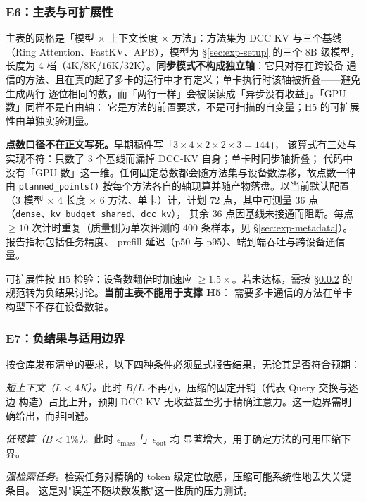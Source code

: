 \subsubsection{E6：主表与可扩展性}

主表的网格是「模型 $\times$ 上下文长度 $\times$ 方法」：方法集为 DCC-KV 与三个基线
（Ring Attention、FastKV、APB），模型为 \S\ref{sec:exp-setup} 的三个 8B 级模型，
长度为 4 档（$4$K/$8$K/$16$K/$32$K）。\textbf{同步模式不构成独立轴}：它只对存在跨设备
通信的方法、且在真的起了多卡的运行中才有定义；单卡执行时该轴被折叠——避免生成两行
逐位相同的数，而「两行一样」会被误读成「异步没有收益」。「GPU 数」同样不是自由轴：
它是方法的前置要求，不是可扫描的自变量；H5 的可扩展性由单独实验测量。

\textbf{点数口径不在正文写死。}早期稿件写「$3\times4\times2\times2\times3=144$」，
该算式有三处与实现不符：只数了 3 个基线而漏掉 DCC-KV 自身；单卡时同步轴折叠；
代码中没有「GPU 数」这一维。任何固定总数都会随方法集与设备数漂移，故点数一律由
\texttt{planned\_points()} 按每个方法各自的轴现算并随产物落盘。以当前默认配置
（3 模型 $\times$ 4 长度 $\times$ 6 方法、单卡）计，计划 $72$ 点，其中可测量
$36$ 点（\texttt{dense}、\texttt{kv\_budget\_shared}、\texttt{dcc\_kv}），
其余 $36$ 点因基线未接通而阻断。每点 $\ge 10$ 次计时重复（质量侧为单次评测的 $400$ 条样本，见 \S\ref{sec:exp-metadata}）。报告指标包括任务精度、
prefill 延迟（p50 与 p95）、端到端吞吐与跨设备通信量。

可扩展性按 H5 检验：设备数翻倍时加速应 $\ge 1.5\times$。若未达标，需按
\S\ref{sec:exp-negative} 的规范转为负结果讨论。\textbf{当前主表不能用于支撑 H5}：
需要多卡通信的方法在单卡构型下不存在设备数轴。

\subsubsection{E7：负结果与适用边界}
\label{sec:exp-negative}

按仓库发布清单的要求，以下四种条件必须显式报告结果，无论其是否符合预期：

\emph{短上下文（$L < 4$K）。}此时 $B/L$ 不再小，压缩的固定开销（代表 Query 交换与逐边
构造）占比上升，预期 DCC-KV 无收益甚至劣于精确注意力。这一边界需明确给出，而非回避。

\emph{低预算（$B < 1\%$）。}此时 $\epsilon_{\text{mass}}$ 与 $\epsilon_{\text{out}}$ 均
显著增大，用于确定方法的可用压缩下界。

\emph{强检索任务。}检索任务对精确的 token 级定位敏感，压缩可能系统性地丢失关键条目。
这是对"误差不随块数发散"这一性质的压力测试。


